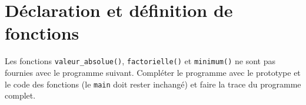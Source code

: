 \begin{correction}
  \end{correction}
  
\section{Déclaration et définition de fonctions}

Les fonctions \verb+valeur_absolue()+, \verb+factorielle()+ et
\verb+minimum()+ ne sont pas fournies avec le programme
suivant. Compléter le programme avec le prototype et le code des
fonctions (le \verb+main+ doit rester inchangé) et
faire la trace du programme complet.

{\footnotesize
{}
}

